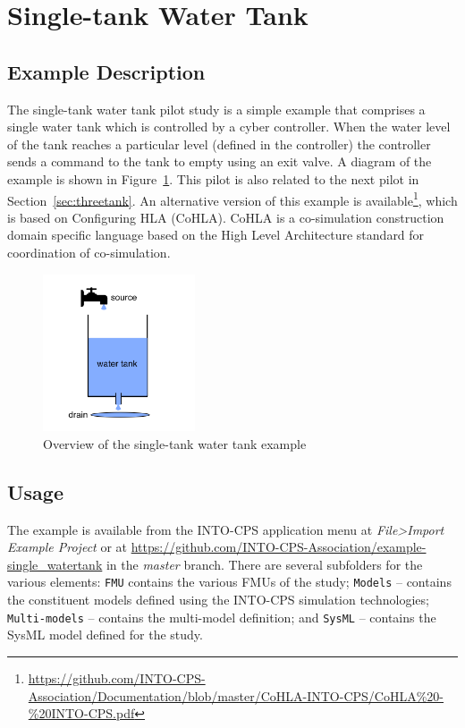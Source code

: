 \section{Single-tank Water Tank}
\label{sec:singletank}

\subsection{Example Description}
\label{sec:singletank_desc}

The single-tank water tank pilot study is a simple example that comprises a single water tank which is controlled by a cyber controller. When the water level of the tank reaches a particular level (defined in the controller) the controller sends a command to the tank to empty using an exit valve. A diagram of the example is shown in Figure~\ref{fig:singletankoverview}. 
This pilot is also related to the next pilot in Section~\ref{sec:threetank}. An alternative version of this example is available\footnote{\url{https://github.com/INTO-CPS-Association/Documentation/blob/master/CoHLA-INTO-CPS/CoHLA\%20-\%20INTO-CPS.pdf}}, which is based on Configuring HLA (CoHLA). CoHLA is a co-simulation construction domain specific language based on the High Level Architecture standard for coordination of co-simulation.

\begin{figure}[htbp]
\begin{center}
\includegraphics[width=0.4\textwidth]{singletank/singletank}
\caption{Overview of the single-tank water tank example}
\label{fig:singletankoverview}
\end{center}
\end{figure}

\subsection{Usage}
\label{sec:singletank_usage}

The example is available from the INTO-CPS application menu at \emph{File>Import Example Project} or at \url{https://github.com/INTO-CPS-Association/example-single_watertank} in the \emph{master} branch. There are several subfolders for the various elements: \texttt{FMU} contains the various FMUs of the study; \texttt{Models} -- contains the constituent models defined using the INTO-CPS simulation technologies; \texttt{Multi-models} -- contains the multi-model definition;  and \texttt{SysML} -- contains the SysML model defined for the study.

